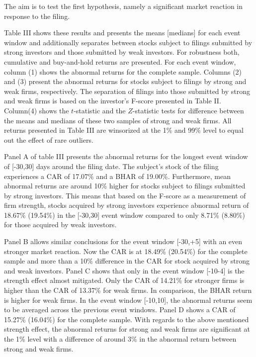 \documentclass[12pt]{article}
\begin{document}
The aim is to test the first hypothesis, namely a significant market reaction in response to the filing.


Table III shows these results and presents the means [medians] for each event window and additionally separates between stocks subject to filings submitted by strong investors and those submitted by weak investors. For robustness both, cumulative and buy-and-hold returns are presented. For each event window, column (1) shows the abnormal returns for the complete sample. Columns (2) and (3) present the abnormal returns for stocks subject to filings by strong and weak firms, respectively. The separation of filings into those submitted by strong and weak firms is based on the investor's F-score presented in Table II. Column(4) shows the $t$-statistic and the $Z$-statistic tests for difference between the means and medians of these two samples of strong and weak firms. All returns presented in Table III are winsorized at the 1\% and 99\% level to equal out the effect of rare outliers. 

Panel A of table III presents the abnormal returns for the longest event window of [-30,30] days around the filing date. The subject's stock of the filing experiences a CAR of 17.07\% and a BHAR of 19.00\%. Furthermore, mean abnormal returns are around 10\% higher for stocks subject to filings submitted by strong investors. This means that based on the F-score as a measurement of firm strength, stocks acquired by strong investors experience abnormal return of 18.67\% (19.54\%) in the [-30,30] event window compared to only 8.71\% (8.80\%) for those acquired by weak investors. 

Panel B allows similar conclusions for the event window [-30,+5] with an even stronger market reaction. Now the CAR is at 18.49\% (20.54\%) for the complete sample and more than a 10\% difference in the CAR for stock acquired by strong and weak investors.
Panel C shows that only in the event window [-10-4] is the strength effect almost mitigated. Only the CAR of 14.21\% for stronger firms is higher than the CAR of 13.37\% for weak firms. In comparison, the BHAR return is higher for weak firms. 
In the event window [-10,10], the abnormal returns seem to be averaged across the previous event windows. Panel D shows a CAR of 15.27\%  (16.04\%) for the complete sample. With regards to the above mentioned strength effect, the abnormal returns for strong and weak firms are significant at the 1\% level with a difference of around 3\% in the abnormal return between strong and weak firms. 
\end{document}
